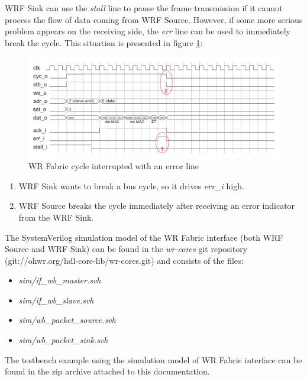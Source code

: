 WRF Sink can use the \emph{stall} line to pause the frame transmission if it cannot
process the flow of data coming from WRF Source. However, if some more serious
problem appears on the receiving side, the \emph{err} line can be used to
immediately break the cycle. This situation is presented in figure
\ref{fig:fabric:cycerr}:

\begin{figure}
  \begin{center}
    \includegraphics[width=\textwidth]{fig/basic_wrf_cycle_err.pdf}
    \caption{WR Fabric cycle interrupted with an error line}
    \label{fig:fabric:cycerr}
  \end{center}
\end{figure}

\begin{enumerate}
  \item WRF Sink wants to break a bus cycle, so it drives \emph{err\_i} high.
  \item WRF Source breaks the cycle immediately after receiving an error indicator
    from the WRF Sink.
\end{enumerate}

The SystemVerilog simulation model of the WR Fabric interface (both WRF Source and 
WRF Sink) can be found in the \emph{wr-cores} git repository
(git://ohwr.org/hdl-core-lib/wr-cores.git) and consists of the files:
\begin{itemize}
  \item \emph{sim/if\_wb\_master.svh}
  \item \emph{sim/if\_wb\_slave.svh}
  \item \emph{sim/wb\_packet\_source.svh}
  \item \emph{sim/wb\_packet\_sink.svh}
\end{itemize}

The testbench example using the simulation model of WR Fabric interface can
be found in the zip archive attached to this documentation.

